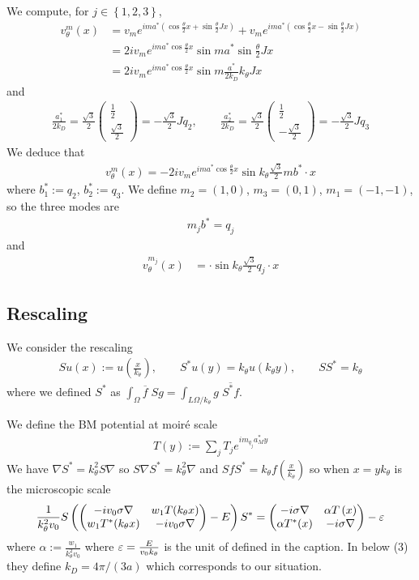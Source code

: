 \documentclass[11pt,a4paper,reqno,french,tikz]{amsart}
\newcommand{\pa}[1]{\left( #1 \right)} %
\newcommand{\acs}[1]{\left\{ #1 \right\}} %
\newcommand{\na}{\nabla} %
\newcommand{\f}[2]{\frac{#1}{#2}} %
\newcommand{\mat}[1]{\begin{pmatrix} #1 \end{pmatrix}} %
\begin{document}
We compute, for $j \in \acs{1,2,3}$,
\begin{align*}
	v^m_\theta(x) &= v_m e^{ima^* \pa{\cos \f{\theta}{2} x + \sin \f{\theta}{2} J x}} +   v_m e^{ima^* \pa{\cos \f{\theta}{2} x - \sin \f{\theta}{2} J x}} \\
		    &= 2i v_m e^{ima^* \cos \f{\theta}{2} x}  \sin ma^* \sin \f{\theta}{2}  Jx \\
		    &=  2i v_m e^{ima^* \cos \f{\theta}{2} x}  \sin m\f{a^*}{2 k_D} k_\theta J x
\end{align*}
and
\begin{align*}
\f{a^*_1}{2 k_D} = \f{\sqrt 3}{2} \mat{ \f{1}{2} \\ \f{\sqrt 3}{2}} = - \f{\sqrt 3}{2} Jq_2, \qquad \f{a^*_2}{2 k_D} = \f{\sqrt 3}{2} \mat{ \f{1}{2} \\ -\f{\sqrt 3}{2}}= - \f{\sqrt 3}{2} Jq_3
\end{align*}
We deduce that
\begin{align*}
	v^m_\theta(x) =  -2i v_m e^{ima^* \cos \f{\theta}{2} x}  \sin k_\theta \f{\sqrt 3}{2} mb^* \cdot x
\end{align*}
where $b^*_1 := q_2$, $b^*_2 := q_3$. We define $m_2=(1,0)$, $m_3=(0,1)$, $m_1 = (-1,-1)$, so the three modes are
\begin{align*}
m_j b^* = q_j
\end{align*}
and
\begin{align*}
	v^{m_j}_\theta(x) &=  \cdot \sin k_\theta \f{\sqrt 3}{2} q_j \cdot x 
\end{align*}



\subsection{Rescaling}%
\label{sub:rescaling}

We consider the rescaling
\begin{align*}
Su(x) := u\pa{\f{x}{k_\theta}}, \qquad S^*u(y) = k_\theta u\pa{k_\theta y}, \qquad S S^* = k_\theta
\end{align*}
where we defined $S^*$ as $\int_\Omega \overline{f} \; Sg = \int_{L\Omega/k_\theta} g \; \overline{S^*f}$.

We define the BM potential at moiré scale
\begin{align*}
T(y) := \sum_j T_j e^{im_{q_j} a^*_M y}
\end{align*}
We have $\na S^* = k_\theta^2 S \na$ so $S \na S^* = k_\theta^2 \na$ and $SfS^* = k_\theta f\pa{\f{x}{k_\theta}}$ so when $x = y k_\theta$ is the microscopic scale
\begin{align*}
	\f{1}{k_\theta^2 v_0} S \pa{\mat{-i v_0 \sigma \na & w_1 T(k_\theta x) \\ w_1 T^*(k_\theta x) & -iv_0 \sigma \na} -E} S^* = \mat{-i\sigma \na & \alpha T\pa{x} \\ \alpha T^*(x) & -i\sigma \na} - \ep
\end{align*}
where $\alpha := \f{w_1}{k_\theta^2 v_0}$ where $\ep = \f{E}{v_0 k_\theta}$ is the unit of \cite[Fig 1]{TarKruVis19} defined in the caption. %
In \cite{TarKruVis19} below (3) they define $k_D = 4\pi/(3a)$ which corresponds to our situation.
\end{document}
